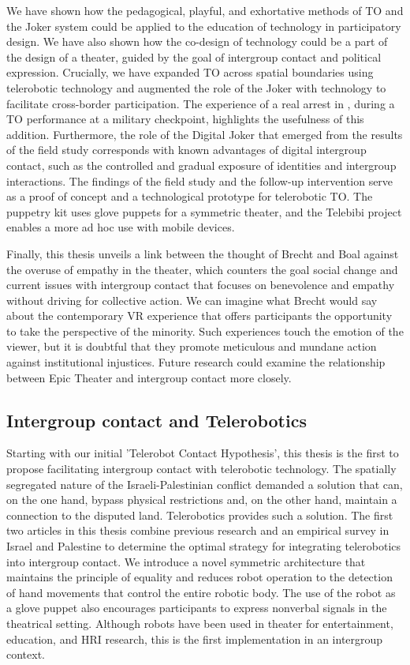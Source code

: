 \documentclass[dissertation,math,vertlayout,pdfa,colorlinks,nologo]{aaltoseries}
\begin{document}
We have shown how the pedagogical, playful, and exhortative methods of TO and the Joker system could be applied to the education of technology in participatory design. We have also shown how the co-design of technology could be a part of the design of a theater, guided by the goal of intergroup contact and political expression. Crucially, we have expanded TO across spatial boundaries using telerobotic technology and augmented the role of the Joker with technology to facilitate cross-border participation. The experience of a real arrest in \cite{alonCHAPTERFOURTEENNonViolent2011}, during a TO performance at a military checkpoint, highlights the usefulness of this addition. Furthermore, the role of the Digital Joker that emerged from the results of the field study corresponds with known advantages of digital intergroup contact, such as the controlled and gradual exposure of identities and intergroup interactions. The findings of the field study and the follow-up intervention serve as a proof of concept and a technological prototype for telerobotic TO. The puppetry kit uses glove puppets for a symmetric theater, and the Telebibi project enables a more ad hoc use with mobile devices. 

Finally, this thesis unveils a link between the thought of Brecht and Boal against the overuse of empathy in the theater, which counters the goal social change and current issues with intergroup contact that focuses on benevolence and empathy without driving for collective action. We can imagine what Brecht would say about the contemporary VR experience that offers participants the opportunity to take the perspective of the minority. Such experiences touch the emotion of the viewer, but it is doubtful that they promote meticulous and mundane action against institutional injustices. Future research could examine the relationship between Epic Theater and intergroup contact more closely.

\subsection{Intergroup contact and Telerobotics}
Starting with our initial 'Telerobot Contact Hypothesis', this thesis is the first to propose facilitating intergroup contact with telerobotic technology. The spatially segregated nature of the Israeli-Palestinian conflict demanded a solution that can, on the one hand, bypass physical restrictions and, on the other hand, maintain a connection to the disputed land. Telerobotics provides such a solution. The first two articles in this thesis combine previous research and an empirical survey in Israel and Palestine to determine the optimal strategy for integrating telerobotics into intergroup contact. We introduce a novel symmetric architecture that maintains the principle of equality and reduces robot operation to the detection of hand movements that control the entire robotic body. The use of the robot as a glove puppet also encourages participants to express nonverbal signals in the theatrical setting. Although robots have been used in theater for entertainment, education, and HRI research, this is the first implementation in an intergroup context. 
\end{document}
